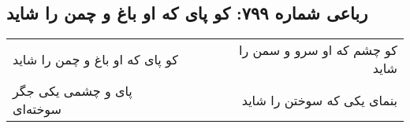 \begin{center}
\section*{رباعی شماره ۷۹۹: کو پای که او باغ و چمن را شاید}
\label{sec:0799}
\begin{longtable}{l p{0.5cm} r}
کو پای که او باغ و چمن را شاید
&&
کو چشم که او سرو و سمن را شاید
\\
پای و چشمی یکی جگر سوخته‌ای
&&
بنمای یکی که سوختن را شاید
\\
\end{longtable}
\end{center}
